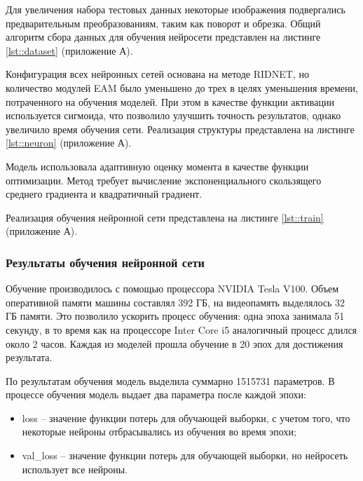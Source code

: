 Для увеличения набора тестовых данных некоторые изображения подвергались предварительным преобразованиям, таким как поворот и обрезка.
Общий алгоритм сбора данных для обучения нейросети представлен на листинге \ref{lst::dataset} (приложение А).

Конфигурация всех нейронных сетей основана на методе RIDNET, но количество модулей EAM было уменьшено до трех в целях уменьшения времени, потраченного на обучения моделей.
При этом в качестве функции активации используется сигмоида, что позволило улучшить точность результатов, однако увеличило время обучения сети.
Реализация структуры представлена на листинге \ref{lst::neuron} (приложение А).

Модель использовала адаптивную оценку момента в качестве функции оптимизации.
Метод требует вычисление экспоненциального скользящего среднего градиента и квадратичный градиент.

Реализация обучения нейронной сети представлена на листинге \ref{lst::train} (приложение А).

\subsubsection{Результаты обучения нейронной сети}
Обучение производилось с помощью процессора NVIDIA Tesla V100.
Объем оперативной памяти машины составлял 392 ГБ, на видеопамять выделялось 32 ГБ памяти.
Это позволило ускорить процесс обучения: одна эпоха занимала 51 секунду, в то время как на процессоре Inter Core i5 аналогичный процесс длился около 2 часов.
Каждая из моделей прошла обучение в 20 эпох для достижения результата.

По результатам обучения модель выделила суммарно 1515731 параметров. 
В процессе обучения модель выдает два параметра после каждой эпохи:
\begin{itemize}
	\item loss -- значение функции потерь для обучающей выборки, с учетом того, что некоторые нейроны отбрасывались из обучения во время эпохи;
	\item val\_loss -- значение функции потерь для обучающей выборки, но нейросеть использует все нейроны.
\end{itemize}

